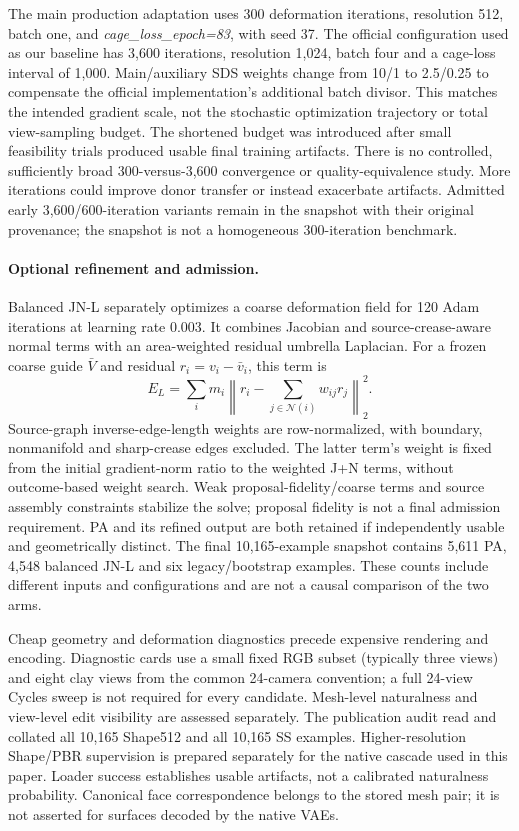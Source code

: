 The main production adaptation uses 300 deformation iterations, resolution
512, batch one, and \emph{cage\_loss\_epoch=83}, with seed 37. The official
configuration used as our baseline has 3,600 iterations, resolution 1,024,
batch four and a cage-loss interval of 1,000. Main/auxiliary SDS weights
change from 10/1 to 2.5/0.25 to compensate the official implementation's
additional batch divisor. This matches the intended gradient scale, not
the stochastic optimization trajectory or total view-sampling budget.
The shortened budget was introduced after small feasibility trials produced
usable final training artifacts. There is no controlled, sufficiently broad
300-versus-3,600 convergence or quality-equivalence study. More iterations
could improve donor transfer or instead exacerbate artifacts. Admitted
early 3,600/600-iteration variants remain in the snapshot with their original
provenance; the snapshot is not a homogeneous 300-iteration benchmark.

\paragraph{Optional refinement and admission.}
Balanced JN-L separately optimizes a coarse deformation field for 120 Adam
iterations at learning rate 0.003. It combines Jacobian and source-crease-aware
normal terms with an area-weighted residual umbrella Laplacian. For a
frozen coarse guide $\bar V$ and residual $r_i=v_i-\bar v_i$, this term is
\begin{equation}
 E_L=\sum_i m_i\left\|r_i-\sum_{j\in\mathcal N(i)}w_{ij}r_j\right\|_2^2.
\end{equation}
Source-graph inverse-edge-length weights are row-normalized, with boundary,
nonmanifold and sharp-crease edges excluded. The latter term's
weight is fixed from the initial gradient-norm ratio to the weighted J+N
terms, without outcome-based weight search. Weak proposal-fidelity/coarse
terms and source assembly constraints stabilize the solve; proposal fidelity
is not a final admission requirement. PA and its refined output are both
retained if independently usable and geometrically distinct. The final
10,165-example snapshot contains 5,611 PA, 4,548 balanced JN-L and six
legacy/bootstrap examples. These counts include different inputs and
configurations and are not a causal comparison of the two arms.

Cheap geometry and deformation diagnostics precede expensive rendering and
encoding. Diagnostic cards use a small fixed RGB subset (typically three
views) and eight clay views from the common 24-camera convention; a full
24-view Cycles sweep is not required for every candidate. Mesh-level
naturalness and view-level edit visibility are assessed separately.
The publication audit read and collated all 10,165 Shape512 and all 10,165
SS examples. Higher-resolution Shape/PBR supervision is prepared separately
for the native cascade used in this paper. Loader success establishes usable
artifacts, not a calibrated naturalness probability. Canonical face
correspondence belongs to the stored mesh pair; it is not asserted for
surfaces decoded by the native VAEs.

